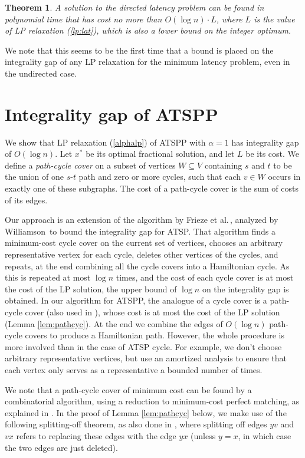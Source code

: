 \documentclass[11pt]{article}
\newtheorem{theorem}{Theorem}[section]
\begin{document}
\begin{theorem} \label{thm:lat}
A solution to the directed latency problem can be found in polynomial time
that has cost no more than $O(\log n)\cdot L$, where $L$ is the value 
of LP relaxation (\ref{lp:lat}), which is also a lower bound on the integer optimum.
\end{theorem}

We note that this seems to be the first time that 
a bound is placed on the integrality gap of any LP relaxation for the minimum latency problem, even in the undirected case.


\section{Integrality gap of ATSPP} \label{sec:atspp-ig}

We show that LP relaxation (\ref{alphalp}) of ATSPP with $\alpha=1$ has integrality gap of $O(\log n)$.
Let $x^*$ be its optimal fractional solution, and let $L$ be its cost.
We define a \emph{path-cycle cover} on a subset of vertices $W\subseteq V$ containing $s$ and $t$ to be the union of one $s$-$t$ path and zero or more cycles, such that each $v\in W$ occurs in exactly one of these subgraphs. The cost of a path-cycle cover is the sum of costs of its edges.

Our approach is an extension of the algorithm by Frieze et al.\,\cite{frieze:galbiati}, analyzed by Williamson\,\cite{williamson:msthesis} to bound the integrality gap for ATSP. That algorithm finds a minimum-cost cycle cover on the current set of vertices, chooses an arbitrary representative vertex for each cycle, deletes other vertices of the cycles, and repeats, at the end combining all the cycle covers into a Hamiltonian cycle. As this is repeated at most $\log n$ times, and the cost of each cycle cover is at most the cost of the LP solution, the upper bound of $\log n$ on the integrality gap is obtained.  In our algorithm for ATSPP, the analogue of a cycle cover is a path-cycle cover (also used in \cite{lam:newman}), whose cost is at most the cost of the LP solution (Lemma \ref{lem:pathcyc}). At the end we combine the edges of $O(\log n)$ path-cycle covers to produce a Hamiltonian path. However, the whole procedure is more involved than in the case of ATSP cycle. For example, we don't choose arbitrary representative vertices, but use an amortized analysis to ensure that each vertex only serves as a representative a bounded number of times.

We note that a path-cycle cover of minimum cost can be found by a combinatorial algorithm, using a reduction to minimum-cost perfect matching, as explained in \cite{lam:newman}.  
In the proof of Lemma \ref{lem:pathcyc} below, we make use of the following splitting-off theorem, as also done in \cite{nagarajan:ravi:polylog}, where splitting off edges $yv$ and $vx$ refers to replacing these edges with the edge $yx$ (unless $y=x$, in which case the two edges are just deleted). 
\end{document}

